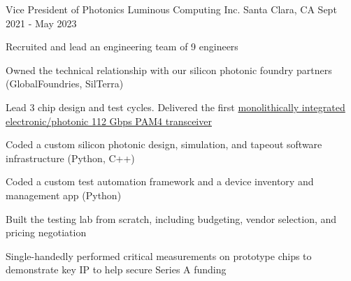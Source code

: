 

\begin{cventries}


  \cventry
    {Vice President of Photonics} %
    {Luminous Computing Inc.}
    {Santa Clara, CA} %
    {Sept 2021 - May 2023} %
    {
      \begin{cvitems} %
        \item {Recruited and lead an engineering team of 9 engineers}
        \item {Owned the technical relationship with our silicon photonic foundry partners (GlobalFoundries, SilTerra)}
        \item {Lead 3 chip design and test cycles. Delivered the first \href{https://preprints.opticaopen.org/articles/preprint/Monolithically_integrated_112_Gbps_PAM4_optical_transmitter_and_receiver_in_a_45nm_CMOS-silicon_photonics_process/22814837}{monolithically integrated electronic/photonic 112 Gbps PAM4 transceiver}}
        \item {Coded a custom silicon photonic design, simulation, and tapeout software infrastructure (Python, C++)}
        \item {Coded a custom test automation framework and a device inventory and management app (Python)}
        \item {Built the testing lab from scratch, including budgeting, vendor selection, and pricing negotiation}
        \item {Single-handedly performed critical measurements on prototype chips to demonstrate key IP to help secure Series A funding}
      \end{cvitems}
    }
    

\end{cventries}
